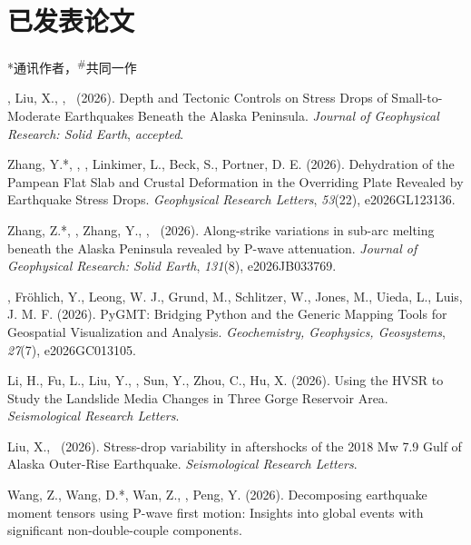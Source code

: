 \section{已发表论文}
\newcommand{\Revision}{\emph{正在审稿}}
\newcommand{\CS}{*} %
\newcommand{\CF}{\textsuperscript{\#}} %

\CS 通讯作者，\CF 共同一作
\begin{etaremune}
\item \Me\CS, Liu, X., \FWang, \SWei\ (2026).
    Depth and Tectonic Controls on Stress Drops of Small-to-Moderate Earthquakes Beneath the Alaska Peninsula.
    \emph{Journal of Geophysical Research: Solid Earth}, \emph{accepted}.
\item Zhang, Y.\CS, \SWei\CS, \Me, Linkimer, L., Beck, S., Portner, D. E. (2026).
    Dehydration of the Pampean Flat Slab and Crustal Deformation in the Overriding Plate Revealed by Earthquake Stress Drops.
    \emph{Geophysical Research Letters}, \emph{53}(22), e2026GL123136.
\item Zhang, Z.\CS, \SWei\CS, Zhang, Y., \FWang, \Me\ (2026).
    Along-strike variations in sub-arc melting beneath the Alaska Peninsula revealed by P-wave attenuation.
    \emph{Journal of Geophysical Research: Solid Earth}, \emph{131}(8), e2026JB033769.
\item
    \Me\CS, Fröhlich, Y., Leong, W. J., Grund, M., Schlitzer, W., Jones, M., Uieda, L., Luis, J. M. F. (2026).
    PyGMT: Bridging Python and the Generic Mapping Tools for Geospatial Visualization and Analysis.
    \emph{Geochemistry, Geophysics, Geosystems}, \emph{27}(7), e2026GC013105.
\item Li, H., Fu, L., Liu, Y., \Me, Sun, Y., Zhou, C., Hu, X. (2026).
    Using the HVSR to Study the Landslide Media Changes in Three Gorge Reservoir Area.
    \emph{Seismological Research Letters}.
\item Liu, X., \Me\CS\ (2026).
    Stress-drop variability in aftershocks of the 2018 Mw 7.9 Gulf of Alaska Outer-Rise Earthquake.
    \emph{Seismological Research Letters}.
\item Wang, Z., Wang, D.\CS, Wan, Z., \Me\CS, Peng, Y. (2026).
    Decomposing earthquake moment tensors using P-wave first motion: Insights into
    global events with significant non-double-couple components.

\end{etaremune}
